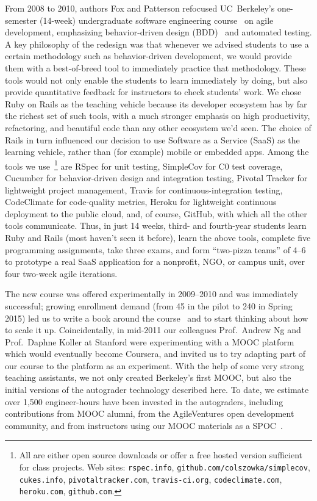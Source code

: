 From 2008 to 2010, authors Fox and Patterson refocused
UC~Berkeley's one-semester (14-week) undergraduate software engineering
course~\cite{crossing_the_software_chasm,agile_sw_curriculum} on agile
development, emphasizing
behavior-driven design (BDD)~\cite{bdd} and automated testing.  A key
 philosophy of the redesign
was that whenever we advised students to use a certain
methodology such as behavior-driven
development, we would provide them with a best-of-breed tool to immediately
practice that methodology.  These tools would not only enable the
students to learn immediately by doing, but also provide quantitative
feedback for instructors to check students' work.  
We chose Ruby on Rails as the teaching vehicle because its developer
ecosystem has by far the richest set of such tools, with a much stronger
emphasis on high productivity, refactoring, and beautiful code than any
other ecosystem we'd seen.
The choice of Rails in turn influenced our decision to use Software as a
Service (SaaS) as the learning vehicle, rather than (for example) mobile
or embedded apps.
Among the tools we
use~\footnote{All are either open source downloads or offer a free
hosted version sufficient for class projects.  Web
sites: \texttt{rspec.info}, \texttt{github.com/colszowka/simplecov},
\texttt{cukes.info}, \texttt{pivotaltracker.com},
\texttt{travis-ci.org}, \texttt{codeclimate.com}, \texttt{heroku.com}, \texttt{github.com}.} 
are 
RSpec for unit testing,
SimpleCov for C0 test coverage,
Cucumber for behavior-driven design and integration testing,
Pivotal Tracker for lightweight project management,
Travis for continuous-integration testing,
CodeClimate for code-quality metrics,
Heroku for lightweight continuous deployment to the public cloud,
and, of course, GitHub, with which all the
other tools communicate.  
Thus, in just 14 weeks, third- and fourth-year students learn Ruby
and Rails (most haven't seen it before), learn the above tools, complete
five programming assignments, take three exams, and form ``two-pizza
teams'' of 4--6 to prototype a real SaaS application for a nonprofit,
NGO, or campus unit, over four two-week agile iterations.

The new course was offered experimentally in 2009--2010 and was
immediately successful; growing enrollment demand (from 45 in the pilot
to 240 in Spring 2015) led 
us to write a book around the course~\cite{esaaS} and to start thinking
about how to scale it up.  
Coincidentally, in mid-2011 our colleagues Prof.~Andrew Ng
and Prof.~Daphne Koller at Stanford were experimenting with a MOOC
platform which would eventually become Coursera, and invited us to try
adapting part of our course to the
platform as an experiment.  With the help of some very strong teaching
assistants, we not only created Berkeley's first MOOC, but also the
initial versions of the autograder technology described here.  To date,
we estimate over 1,500 engineer-hours have been invested in the
autograders, including contributions from MOOC alumni,
from the AgileVentures  open development community,
and from
instructors using our MOOC materials as a SPOC~\cite{moocs-spocs-TR}.

